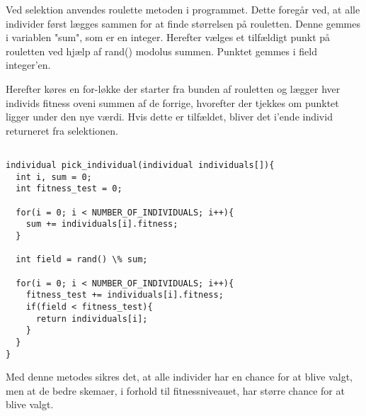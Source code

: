 Ved selektion anvendes roulette metoden i programmet. Dette foregår ved, at alle individer først lægges sammen for at finde størrelsen på rouletten. Denne gemmes i variablen "sum", som er en integer. Herefter vælges et tilfældigt punkt på rouletten ved hjælp af rand() modolus summen. Punktet gemmes i field integer'en.

Herefter køres en for-løkke der starter fra bunden af rouletten og lægger hver individs fitness oveni summen af de forrige, hvorefter der tjekkes om punktet ligger under den nye værdi. Hvis dette er tilfældet, bliver det i'ende individ returneret fra selektionen.  

\begin{lstlisting}[langueage=c]

individual pick_individual(individual individuals[]){
  int i, sum = 0;
  int fitness_test = 0;

  for(i = 0; i < NUMBER_OF_INDIVIDUALS; i++){
    sum += individuals[i].fitness;
  }

  int field = rand() \% sum;

  for(i = 0; i < NUMBER_OF_INDIVIDUALS; i++){
    fitness_test += individuals[i].fitness;
    if(field < fitness_test){
      return individuals[i];
    }
  }
}

\end{lstlisting}

Med denne metodes sikres det, at alle individer har en chance for at blive valgt, men at de bedre skemaer, i forhold til fitnessniveauet, har større chance for at blive valgt.